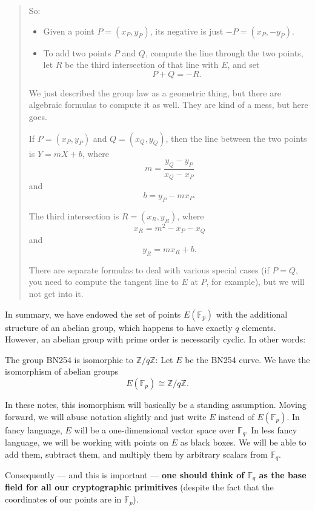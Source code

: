 \begin{quote}
So:

\begin{itemize}
\item
  Given a point \(P = ( x_{P},y_{P} )\), its negative is just
  \(- P = ( x_{P}, - y_{P} )\).
\item
  To add two points \(P\) and \(Q\), compute the line through the two
  points, let \(R\) be the third intersection of that line with \(E\),
  and set \[P + Q = - R.\]
\end{itemize}

We just described the group law as a geometric thing, but there are
algebraic formulas to compute it as well. They are kind of a mess, but
here goes.

If \(P = ( x_{P},y_{P} )\) and
\(Q = ( x_{Q},y_{Q} )\), then the line between the two points
is \(Y = mX + b\), where \[m = \frac{y_{Q} - y_{P}}{x_{Q} - x_{P}}\] and
\[b = y_{P} - mx_{P}.\]

The third intersection is \(R = ( x_{R},y_{R} )\), where
\[x_{R} = m^{2} - x_{P} - x_{Q}\] and \[y_{R} = mx_{R} + b.\]

There are separate formulas to deal with various special cases (if
\(P = Q\), you need to compute the tangent line to \(E\) at \(P\), for
example), but we will not get into it.

\end{quote}

In summary, we have endowed the set of points
\(E( {\mathbb{F}}_{p} )\) with the additional structure of an
abelian group, which happens to have exactly \(q\) elements. However, an
abelian group with prime order is necessarily cyclic. In other words:

\begin{theorem}
The group BN254 is isomorphic to \({\mathbb{Z}}/q{\mathbb{Z}}\): Let
\(E\) be the BN254 curve. We have the isomorphism of abelian groups
\[E( {\mathbb{F}}_{p} ) \cong {\mathbb{Z}}/q{\mathbb{Z}}.\]
\end{theorem}

In these notes, this isomorphism will basically be a standing
assumption. Moving forward, we will abuse notation slightly and just
write \(E\) instead of \(E( {\mathbb{F}}_{p} )\). In fancy
language, \(E\) will be a one-dimensional vector space over
\({\mathbb{F}}_{q}\). In less fancy language, we will be working with
points on \(E\) as black boxes. We will be able to add them, subtract
them, and multiply them by arbitrary scalars from \({\mathbb{F}}_{q}\).

Consequently --- and this is important --- \textbf{one should think of
\({\mathbb{F}}_{q}\) as the base field for all our cryptographic
primitives} (despite the fact that the coordinates of our points are in
\({\mathbb{F}}_{p}\)).

